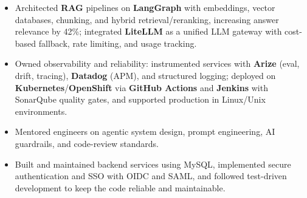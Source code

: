 \documentclass[a4paper]{article}
\begin{document}
\begin{itemize}
\item {Architected \textbf{RAG} pipelines on \textbf{LangGraph} with embeddings, vector databases, chunking, and hybrid retrieval/reranking, increasing answer relevance by 42\%; integrated \textbf{LiteLLM} as a unified LLM gateway with cost-based fallback, rate limiting, and usage tracking.}
\item {Owned observability and reliability: instrumented services with \textbf{Arize} (eval, drift, tracing), \textbf{Datadog} (APM), and structured logging; deployed on \textbf{Kubernetes}/\textbf{OpenShift} via \textbf{GitHub Actions} and \textbf{Jenkins} with SonarQube quality gates, and supported production in Linux/Unix environments.}
\item {Mentored engineers on agentic system design, prompt engineering, AI guardrails, and code-review standards.}
\item {Built and maintained backend services using MySQL, implemented secure authentication and SSO with OIDC and SAML, and followed test-driven development to keep the code reliable and maintainable.}
\end{itemize}
\end{document}
